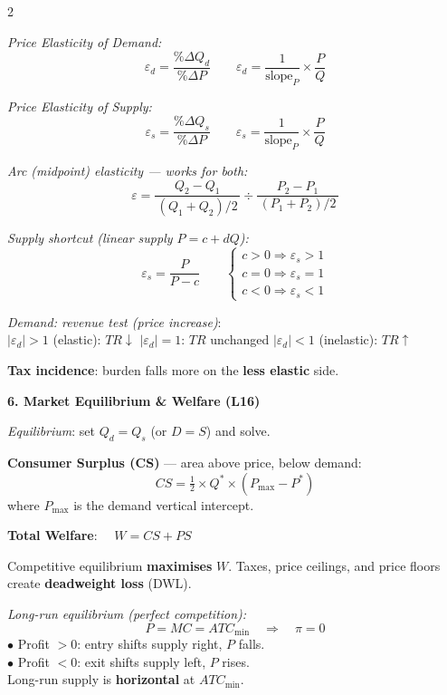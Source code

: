 \documentclass[9pt]{article}
\begin{document}
\begin{multicols}{2}
\begin{bluebox}
\textit{Price Elasticity of Demand:}
\[
  \varepsilon_d = \frac{\%\Delta Q_d}{\%\Delta P}
  \qquad
  \varepsilon_d = \frac{1}{\text{slope}_{P}} \times \frac{P}{Q}
\]

\textit{Price Elasticity of Supply:}
\[
  \varepsilon_s = \frac{\%\Delta Q_s}{\%\Delta P}
  \qquad
  \varepsilon_s = \frac{1}{\text{slope}_{P}} \times \frac{P}{Q}
\]

\textit{Arc (midpoint) elasticity --- works for both:}
\[
  \varepsilon = \frac{Q_2 - Q_1}{\,(Q_1+Q_2)/2\,}
             \div
             \frac{P_2 - P_1}{\,(P_1+P_2)/2\,}
\]

\textit{Supply shortcut (linear supply $P = c + dQ$):}
\[
  \varepsilon_s = \frac{P}{P - c}
  \qquad
  \begin{cases}
    c > 0 \Rightarrow \varepsilon_s > 1\\
    c = 0 \Rightarrow \varepsilon_s = 1\\
    c < 0 \Rightarrow \varepsilon_s < 1
  \end{cases}
\]

\smallskip
\textit{Demand: revenue test (price increase)}:\\
$|\varepsilon_d|>1$ (elastic): $TR\downarrow$ \quad
$|\varepsilon_d|=1$: $TR$ unchanged \quad
$|\varepsilon_d|<1$ (inelastic): $TR\uparrow$

\smallskip
\textbf{Tax incidence}: burden falls more on the \textbf{less elastic} side.
\end{bluebox}

\begin{bluebox}
\textbf{\color{micro_blue}6. Market Equilibrium \& Welfare (L16)}

\textit{Equilibrium}: set $Q_d = Q_s$ (or $D = S$) and solve.

\smallskip
\textbf{Consumer Surplus (CS)} --- area above price, below demand:
\[
  CS = \tfrac{1}{2} \times Q^* \times (P_{\max} - P^*)
\]
where $P_{\max}$ is the demand vertical intercept.

\smallskip
\textbf{Total Welfare}: $\quad W = CS + PS$

\smallskip
Competitive equilibrium \textbf{maximises} $W$. Taxes, price ceilings, and price floors create \textbf{deadweight loss} (DWL).

\smallskip
\textit{Long-run equilibrium (perfect competition):}
\[
  P = MC = ATC_{\min}
  \quad \Rightarrow \quad \pi = 0
\]
$\bullet$ Profit $> 0$: entry shifts supply right, $P$ falls.\\
$\bullet$ Profit $< 0$: exit shifts supply left, $P$ rises.\\
Long-run supply is \textbf{horizontal} at $ATC_{\min}$.
\end{bluebox}

\end{multicols}
\end{document}
